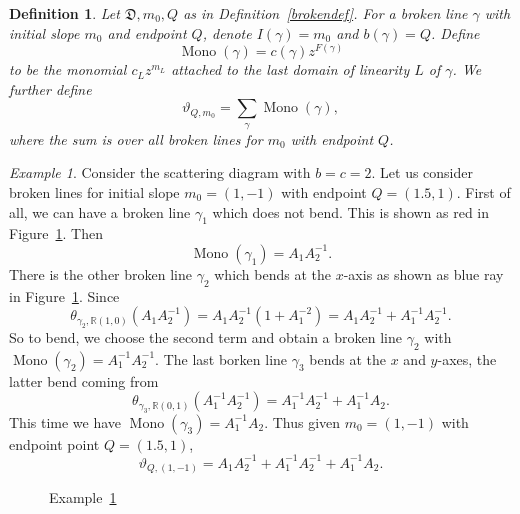 \documentclass[12pt]{amsart}
\newtheorem{defn}[theorem]{Definition}
\theoremstyle{remark}
\newtheorem{example}[theorem]{Example}
\newcommand{\RR}{\mathbb{R}}
\newcommand{\DD}{\mathfrak{D}}
\newcommand{\Mono}{\operatorname{Mono}}
\begin{document}
\begin{defn}
Let $\DD, m_0, Q$ as in Definition~\ref{brokendef}. For a broken line $\gamma$ with initial slope $m_0$ and endpoint $Q$, denote $I(\gamma) = m_0$ and $b(\gamma) = Q$. Define
\[\Mono (\gamma) = c(\gamma)z^{F(\gamma)}\]
to be the monomial $c_L z^{m_L}$ attached to the last domain of linearity $L$ of $\gamma$. We further define
\[ \vartheta_{Q, m_0} = \sum_{\gamma} \Mono (\gamma), \]
where the sum is over all broken lines for $m_0$ with endpoint $Q$.
\end{defn}


\begin{example} \label{brokenex}
Consider the scattering diagram with $b=c=2$. Let us consider broken lines for initial slope $m_0 = (1,-1)$ with endpoint $Q= (1.5,1)$. First of all, we can have a broken line $\gamma_1$ which does not bend. This is shown as red in Figure~\ref{figbrokenex}. Then
\[\Mono(\gamma_1) = A_1 A_2^{-1}.\]
There is the other broken line $\gamma_2$ which bends at the $x$-axis as shown 
as blue ray in Figure~\ref{figbrokenex}. Since
\[ \theta_{\gamma_2, \RR(1,0)} (A_1 A_2^{-1}) = A_1 A_2^{-1}(1+A_1^{-2}) =  A_1 A_2^{-1} + A_1^{-1} A_2^{-1} . \]
So to bend, we choose the second term and obtain a broken line
$\gamma_2$ with $\Mono(\gamma_2) =  A_1^{-1} A_2^{-1}$. The last borken
line $\gamma_3$ bends at the $x$ and $y$-axes, the latter
bend coming from
\[ \theta_{ \gamma_3, \RR(0,1)} ( A_1^{-1} A_2^{-1}) =  A_1^{-1} A_2^{-1} + A_1^{-1} A_2.  \]
This time we have $\Mono (\gamma_3) = A_1^{-1} A_2$. Thus given $m_0 = (1,-1)$ with endpoint point $Q= (1.5,1)$, 
\[ \vartheta_{Q,(1,-1)} =  A_1 A_2^{-1} + A_1^{-1} A_2^{-1} +A_1^{-1} A_2 .  \]


\begin{figure}
\centering
{}
\caption{Example~\ref{brokenex}} \label{figbrokenex}
\end{figure}

\end{example}
\end{document}
